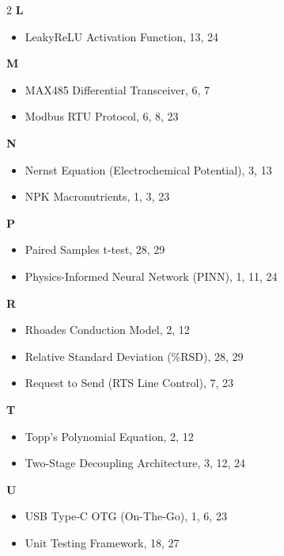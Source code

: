 \begin{multicols}{2}
\textbf{L}
\begin{itemize}[leftmargin=1.5em, itemsep=1pt]
    \item LeakyReLU Activation Function, 13, 24
\end{itemize}

\textbf{M}
\begin{itemize}[leftmargin=1.5em, itemsep=1pt]
    \item MAX485 Differential Transceiver, 6, 7
    \item Modbus RTU Protocol, 6, 8, 23
\end{itemize}

\textbf{N}
\begin{itemize}[leftmargin=1.5em, itemsep=1pt]
    \item Nernst Equation (Electrochemical Potential), 3, 13
    \item NPK Macronutrients, 1, 3, 23
\end{itemize}

\textbf{P}
\begin{itemize}[leftmargin=1.5em, itemsep=1pt]
    \item Paired Samples t-test, 28, 29
    \item Physics-Informed Neural Network (PINN), 1, 11, 24
\end{itemize}

\textbf{R}
\begin{itemize}[leftmargin=1.5em, itemsep=1pt]
    \item Rhoades Conduction Model, 2, 12
    \item Relative Standard Deviation (\%RSD), 28, 29
    \item Request to Send (RTS Line Control), 7, 23
\end{itemize}

\textbf{T}
\begin{itemize}[leftmargin=1.5em, itemsep=1pt]
    \item Topp's Polynomial Equation, 2, 12
    \item Two-Stage Decoupling Architecture, 3, 12, 24
\end{itemize}

\textbf{U}
\begin{itemize}[leftmargin=1.5em, itemsep=1pt]
    \item USB Type-C OTG (On-The-Go), 1, 6, 23
    \item Unit Testing Framework, 18, 27
\end{itemize}

\end{multicols}
